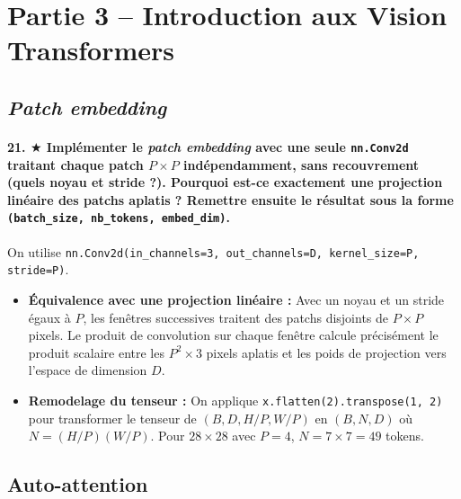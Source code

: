 \documentclass{report}
\begin{document}
\section{Partie 3 -- Introduction aux Vision Transformers}

\subsection{\textit{Patch embedding}}
\paragraph{21. $\bigstar$ Implémenter le \textit{patch embedding} avec une seule \texttt{nn.Conv2d} traitant chaque patch $P \times P$ indépendamment, sans recouvrement (quels noyau et stride ?). Pourquoi est-ce exactement une projection linéaire des patchs aplatis ? Remettre ensuite le résultat sous la forme \texttt{(batch\_size, nb\_tokens, embed\_dim)}.}
On utilise \texttt{nn.Conv2d(in\_channels=3, out\_channels=D, kernel\_size=P, stride=P)}.
\begin{itemize}
    \item \textbf{Équivalence avec une projection linéaire :} Avec un noyau et un stride égaux à $P$, les fenêtres successives traitent des patchs disjoints de $P \times P$ pixels. Le produit de convolution sur chaque fenêtre calcule précisément le produit scalaire entre les $P^2 \times 3$ pixels aplatis et les poids de projection vers l'espace de dimension $D$.
    \item \textbf{Remodelage du tenseur :} On applique \texttt{x.flatten(2).transpose(1, 2)} pour transformer le tenseur de $(B, D, H/P, W/P)$ en $(B, N, D)$ où $N = (H/P)(W/P)$. Pour $28 \times 28$ avec $P=4$, $N = 7 \times 7 = 49$ tokens.
\end{itemize}

\subsection{Auto-attention}
\end{document}
